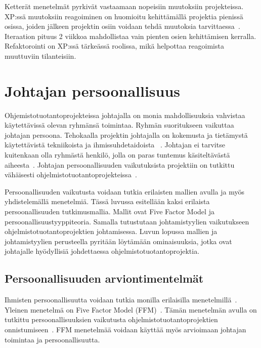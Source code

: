 \documentclass[finnish]{tktltiki2}
\theoremstyle{definition}
\theoremstyle{remark}
\begin{document}
Ketterät menetelmät pyrkivät vastaamaan nopeisiin muutoksiin projekteissa. XP:ssä muutoksiin reagoiminen on huomioitu kehittämällä projektia pienissä osissa, joiden jälkeen projektin osiin voidaan tehdä muutoksia tarvittaessa~\cite{796139}. Iteraation pituus 2 viikkoa mahdollistaa vain pienten osien kehittämisen kerralla. Refaktorointi on XP:ssä tärkeässä roolissa, mikä helpottaa reagoimista muuttuviin tilanteisiin.

 

\section{Johtajan persoonallisuus}

Ohjemistotuotantoprojekteissa johtajalla on monia mahdollisuuksia vahvistaa käytettävissä olevan ryhmänsä toimintaa. Ryhmän suoritukseen vaikuttaa johtajan persoona. Tehokaalla projektin johtajalla on kokemusta ja tietämystä käytettävistä tekniikoista ja ihmissuhdetaidoista ~\cite{McLeod:2011:FAS:1978802.1978803}. Johtajan ei tarvitse kuitenkaan olla ryhmästä henkilö, jolla on paras tuntemus käsiteltävästä aiheesta~\cite{4017705}. Johtajan persoonallisuuden vaikutuksista projektiin on tutkittu vähäisesti ohjelmistotuotantoprojekteissa~\cite{Wang:2009:PMP:1639950.1640049}.

Persoonallisuuden vaikutusta voidaan tutkia erilaisten mallien avulla ja myös yhdistelemällä menetelmiä. Tässä luvussa esitellään kaksi erilaista persoonallisuuden tutkimusmallia. Mallit ovat Five Factor Model ja persoonallisuustyyppiteoria. Samalla tutustutaan johtamistyylien vaikutukseen ohjelmistotuotantoprojektien johtamisessa. Luvun lopussa mallien ja johtamistyylien perusteella pyritään löytämään ominaisuuksia, jotka ovat johtajalle hyödyllisiä johdettaessa ohjelmistotuotantoprojektia.  



\subsection{Persoonallisuuden arviontimentelmät}

Ihmisten persoonallisuutta voidaan tutkia monilla erilaisilla menetelmillä~\cite{digman1990personality}. Yleinen menetelmä on Five Factor Model (FFM)~\cite{digman1990personality, barrick2006big}. Tämän menetelmän avulla on tutkittu persoonallisuuksien vaikutusta ohjelmistotuotantoprojektien onnistumiseen~\cite{Wang:2009:PMP:1639950.1640049}. FFM menetelmää voidaan käyttää myös arvioimaan johtajan toimintaa ja persoonallisuutta.
\end{document}
